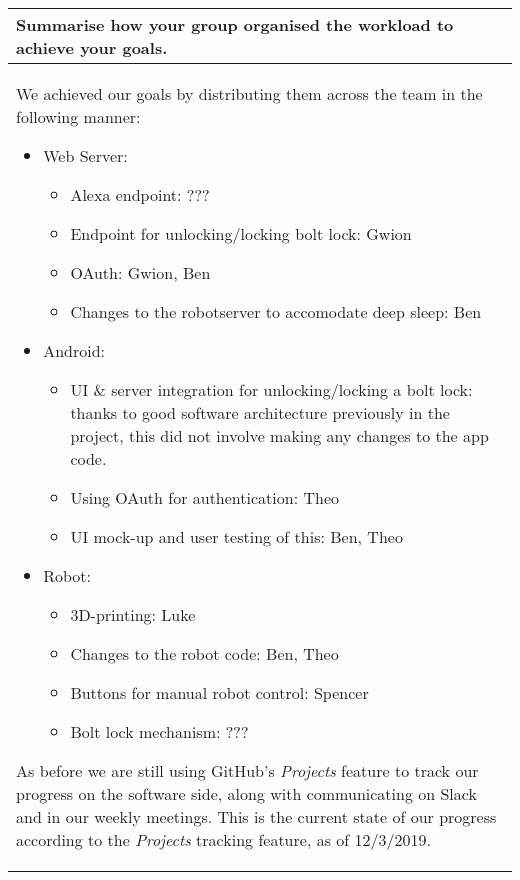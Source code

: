\documentclass[a4paper]{article}
\newcommand{\colWidth}{141mm}
\begin{document}
\begin{center}

\begin{tabular}{|p{\colWidth}|}
	\hline
	\cellcolor{blue!25}\large
	\textbf{Summarise how your group organised the workload to achieve your goals.}
	\\ \hline
	
		We achieved our goals by distributing them across the team in the following manner:
		\begin{itemize}
			\item Web Server:
				\begin{itemize}
					\item Alexa endpoint: {\color{red} ???}
					\item Endpoint for unlocking/locking bolt lock: Gwion
					\item OAuth: Gwion, Ben
					\item Changes to the robotserver to accomodate deep sleep: Ben
				\end{itemize}
			\item Android:
				\begin{itemize}
					\item UI \& server integration for unlocking/locking a bolt lock: thanks to good software architecture previously in the project, this did not involve making any changes to the app code.
					\item Using OAuth for authentication: Theo
					\item UI mock-up and user testing of this: Ben, Theo
				\end{itemize}
			\item Robot:
			\begin{itemize}
				\item 3D-printing: Luke
				\item Changes to the robot code: Ben, Theo
				\item Buttons for manual robot control: Spencer
				\item Bolt lock mechanism: {\color{red} ???}
			\end{itemize}
		\end{itemize}

		As before we are still using GitHub's \textit{Projects} feature to track our progress on the software side, along with communicating on Slack and in our weekly meetings.
		This is the current state of our progress according to the \textit{Projects} tracking feature, as of 12/3/2019.
		
		\vspace{3mm}
		

\end{tabular}
\end{center}
\end{document}
